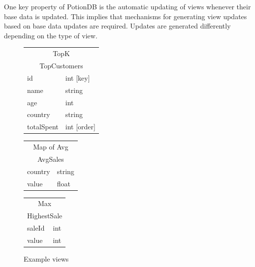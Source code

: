 \documentclass{vldb}
\begin{document}
One key property of PotionDB is the automatic updating of views whenever their base data is updated.
This implies that mechanisms for generating view updates based on base data updates are required.
Updates are generated differently depending on the type of view.

\begin{figure}
	\centering
	\begin{tabular}{|l|l|}
		\multicolumn{2}{c}{TopK} \\
		\multicolumn{2}{c}{TopCustomers} \\ \hline
		id            & int [key]         \\ \hline
		name          & string       \\ \hline
		age           & int          \\ \hline
		country       & string      \\ \hline
		totalSpent & int [order] \\
		\hline
	\end{tabular} \hspace{0.1em}
	\begin{tabular}{|l|l|}
			\multicolumn{2}{c}{Map of Avg} \\
			\multicolumn{2}{c}{AvgSales} \\ \hline
			country & string \\ \hline
			value        & float  \\
			\hline       
	\end{tabular} \hspace{0.1em}
	\begin{tabular}{|l|l|}
		\multicolumn{2}{c}{Max} \\
		\multicolumn{2}{c}{HighestSale} \\ \hline
		saleId & int \\ \hline
		value & int \\
		\hline      
	\end{tabular}
	\caption{Example views}
	\label{fig:views}
\end{figure}

\end{document}
